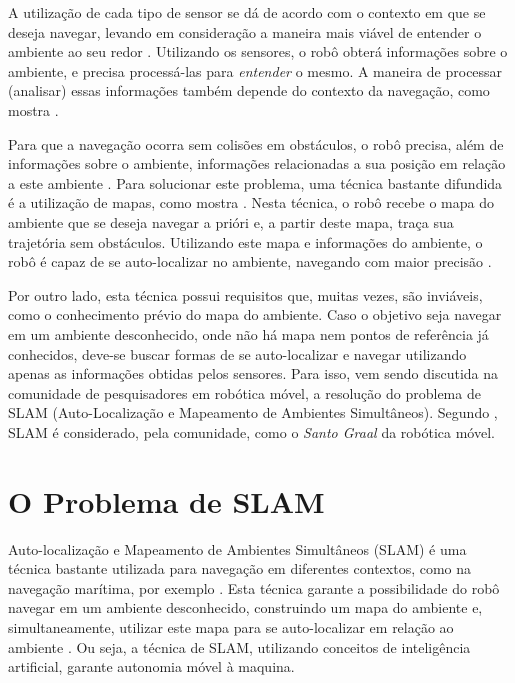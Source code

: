A utilização de cada tipo de sensor se dá de acordo com o contexto em que se deseja navegar, levando em consideração a maneira mais viável de entender o ambiente ao seu redor \cite{agenteExploratorioKalman}. Utilizando os sensores, o robô obterá informações sobre o ambiente, e precisa processá-las para \textit{entender} o mesmo. A maneira de processar (analisar) essas informações também depende do contexto da navegação, como mostra \cite{roboBulldozerIV}.

Para que a navegação ocorra sem colisões em obstáculos, o robô precisa, além de informações sobre o ambiente, informações relacionadas a sua posição em relação a este ambiente \cite{theCleaningProject}. Para solucionar este problema, uma técnica bastante difundida é a utilização de mapas, como mostra \cite{roboBulldozerIV}. Nesta técnica, o robô recebe o mapa do ambiente que se deseja navegar a prióri e, a partir deste mapa, traça sua trajetória sem obstáculos. Utilizando este mapa e informações do ambiente, o robô é capaz de se auto-localizar no ambiente, navegando com maior precisão \cite{roboBulldozerIV}.

Por outro lado, esta técnica possui requisitos que, muitas vezes, são inviáveis, como o conhecimento prévio do mapa do ambiente. Caso o objetivo seja navegar em um ambiente desconhecido, onde não há mapa nem pontos de referência já conhecidos, deve-se buscar formas de se auto-localizar e navegar utilizando apenas as informações obtidas pelos sensores. Para isso, vem sendo discutida na comunidade de pesquisadores em robótica móvel, a resolução do problema de SLAM (Auto-Localização e Mapeamento de Ambientes Simultâneos). Segundo \cite{slamProblem}, SLAM é considerado, pela comunidade, como o \textit{Santo Graal} da robótica móvel.

\section{O Problema de SLAM} %
\label{sec:section_name}

Auto-localização e Mapeamento de Ambientes Simultâneos (SLAM) é uma técnica bastante utilizada para navegação em diferentes contextos, como na navegação marítima, por exemplo \cite{slamProblem}. Esta técnica garante a possibilidade do robô navegar em um ambiente desconhecido, construindo um mapa do ambiente e, simultaneamente, utilizar este mapa para se auto-localizar em relação ao ambiente \cite{slamProblem}. Ou seja, a técnica de SLAM, utilizando conceitos de inteligência artificial, garante autonomia móvel à maquina.

